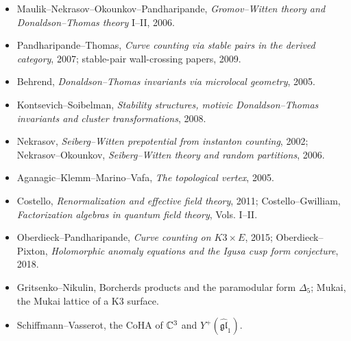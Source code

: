 \begin{itemize}
\item Maulik--Nekrasov--Okounkov--Pandharipande, \emph{Gromov--Witten
theory and Donaldson--Thomas theory} I--II, 2006.
\item Pandharipande--Thomas, \emph{Curve counting via stable pairs in
the derived category}, 2007; stable-pair wall-crossing papers, 2009.
\item Behrend, \emph{Donaldson--Thomas invariants via microlocal
geometry}, 2005.
\item Kontsevich--Soibelman, \emph{Stability structures, motivic
Donaldson--Thomas invariants and cluster transformations}, 2008.
\item Nekrasov, \emph{Seiberg--Witten prepotential from instanton
counting}, 2002; Nekrasov--Okounkov, \emph{Seiberg--Witten theory and
random partitions}, 2006.
\item Aganagic--Klemm--Marino--Vafa, \emph{The topological vertex},
2005.
\item Costello, \emph{Renormalization and effective field theory},
2011; Costello--Gwilliam, \emph{Factorization algebras in quantum
field theory}, Vols. I--II.
\item Oberdieck--Pandharipande, \emph{Curve counting on
\(K3\times E\)}, 2015; Oberdieck--Pixton, \emph{Holomorphic anomaly
equations and the Igusa cusp form conjecture}, 2018.
\item Gritsenko--Nikulin, Borcherds products and the paramodular
form \(\Delta_{5}\); Mukai, the Mukai lattice of a K3 surface.
\item Schiffmann--Vasserot, the CoHA of \(\mathbb{C}^3\) and
\(Y^+(\widehat{\mathfrak{gl}}_1)\).
\end{itemize}

